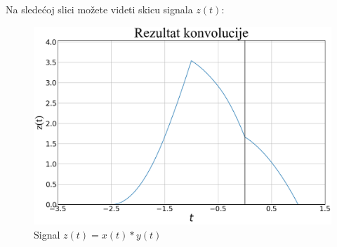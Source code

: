 \documentclass[titlepage,a4paper,12pt]{article}
\begin{document}
	\clearpage
	\noindent Na sledećoj slici možete videti skicu signala $z(t):$
	\begin{figure}[ht]
		\centering
		\includegraphics[width=\textwidth]{Images/zadatak2pic2.png}
		\caption{Signal $z(t) = x(t) *y(t)$}\label{fig:slika6}
	\end{figure}\\
	
	
\end{document}
